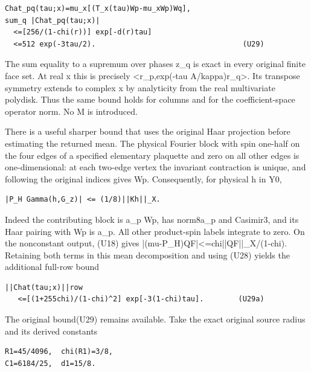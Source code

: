 \documentclass[11pt,a4paper]{article}
\renewcommand{\[}{\begingroup\small\originaldisplaystart}
\renewcommand{\]}{\originaldisplayend\endgroup}
\begin{document}
\begin{verbatim}
Chat_pq(tau;x)=mu_x[(T_x(tau)Wp-mu_xWp)Wq],
sum_q |Chat_pq(tau;x)|
  <=[256/(1-chi(r))] exp[-d(r)tau]
  <=512 exp(-3tau/2).                                  (U29)
\end{verbatim}

The sum equality to a supremum over phases z\_q is exact in every
original finite face set. At real x this is precisely
\textless r\_p,exp(-tau A/kappa)r\_q\textgreater. Its transpose symmetry
extends to complex x by analyticity from the real multivariate polydisk.
Thus the same bound holds for columns and for the coefficient-space
operator norm. No M is introduced.

There is a useful sharper bound that uses the original Haar projection
before estimating the returned mean. The physical Fourier block with
spin one-half on the four edges of a specified elementary plaquette and
zero on all other edges is one-dimensional: at each two-edge vertex the
invariant contraction is unique, and following the original indices
gives Wp. Consequently, for physical h in Y0,

\begin{verbatim}
|P_H Gamma(h,G_z)| <= (1/8)||Kh||_X.
\end{verbatim}

Indeed the contributing block is a\_p Wp, has
norm8\textbar a\_p\textbar{} and Casimir3, and its Haar pairing with Wp
is a\_p. All other product-spin labels integrate to zero. On the
nonconstant output, (U18) gives
{|\allowbreak{}(\allowbreak{}m\allowbreak{}u\allowbreak{}-\allowbreak{}P\allowbreak{}\_\allowbreak{}H\allowbreak{})\allowbreak{}Q\allowbreak{}F\allowbreak{}|\allowbreak{}\textless{}\allowbreak{}=\allowbreak{}c\allowbreak{}h\allowbreak{}i\allowbreak{}|\allowbreak{}|\allowbreak{}Q\allowbreak{}F\allowbreak{}|\allowbreak{}|\allowbreak{}\_\allowbreak{}X\allowbreak{}/\allowbreak{}(\allowbreak{}1\allowbreak{}-\allowbreak{}c\allowbreak{}h\allowbreak{}i\allowbreak{})\allowbreak{}.\allowbreak{}}
Retaining both terms in this mean decomposition and using (U28) yields
the additional full-row bound

\begin{verbatim}
||Chat(tau;x)||row
   <=[(1+255chi)/(1-chi)^2] exp[-3(1-chi)tau].        (U29a)
\end{verbatim}

The original bound(U29) remains available. Take the exact original
source radius and its derived constants

\begin{verbatim}
R1=45/4096,  chi(R1)=3/8,
C1=6184/25,  d1=15/8.
\end{verbatim}
\end{document}
